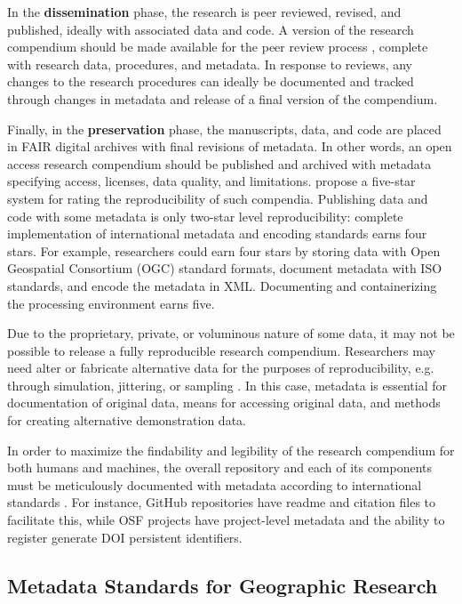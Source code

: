 \documentclass{isprs} %
\begin{document}
In the \textbf{dissemination} phase, the research is peer reviewed, revised, and published, ideally with associated data and code.
A version of the research compendium should be made available for the peer review process \citep{Singleton2016}, complete with research data, procedures, and metadata.
In response to reviews, any changes to the research procedures can ideally be documented and tracked through changes in metadata and release of a final version of the compendium.

Finally, in the \textbf{preservation} phase, the manuscripts, data, and code are placed in FAIR digital archives with final revisions of metadata.
In other words, an open access research compendium should be published and archived with metadata specifying access, licenses, data quality, and limitations. 
\citep{Wilson2021} propose a five-star system for rating the reproducibility of such compendia.
Publishing data and code with some metadata is only two-star level reproducibility: complete implementation of international metadata and encoding standards earns four stars.
For example, researchers could earn four stars by storing data with Open Geospatial Consortium (OGC) standard formats, document metadata with ISO standards, and encode the metadata in XML.
Documenting and containerizing the processing environment earns five.

Due to the proprietary, private, or voluminous nature of some data, it may not be possible to release a fully reproducible research compendium.
Researchers may need alter or fabricate alternative data for the purposes of reproducibility, e.g. through simulation, jittering, or sampling \citet{Tullis2021,Singleton2016}. 
In this case, metadata is essential for documentation of original data, means for accessing original data, and methods for creating alternative demonstration data.

In order to maximize the findability and legibility of the research compendium for both humans and machines, the overall repository and each of its components must be meticulously documented with metadata according to international standards \citep{Wilkinson2016,Wilson2021}.
For instance, GitHub repositories have readme and citation files to facilitate this, while OSF projects have project-level metadata and the ability to register generate DOI persistent identifiers.


 
\subsection{Metadata Standards for Geographic Research}\label{sec:Metadata}
\end{document}
